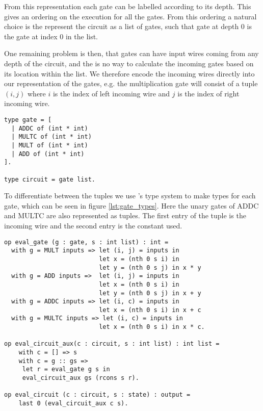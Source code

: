 
From this representation each gate can be labelled according to its depth. This
gives an ordering on the execution for all the gates. From this ordering a
natural choice is the represent the circuit as a list of gates, such that gate
at depth 0 is the gate at index 0 in the list.

One remaining problem is then, that gates can have input wires coming from any
depth of the circuit, and the is no way to calculate the incoming gates based on
its location within the list. We therefore encode the incoming wires directly
into our representation of the gates, e.g. the multiplication gate will consist
of a tuple $(i,j)$ where $i$ is the index of left incoming wire and $j$ is the
index of right incoming wire.

\begin{lstlisting}[float,label=lst:gate_types,caption=Type declaration of gates]
type gate = [
  | ADDC of (int * int)
  | MULTC of (int * int)
  | MULT of (int * int)
  | ADD of (int * int)
].

type circuit = gate list.
\end{lstlisting}

To differentiate between the tuples we use \easycrypt's type system to make
types for each gate, which can be seen in figure \ref{lst:gate_types}. Here the
unary gates of ADDC and MULTC are also represented as tuples. The first entry of
the tuple is the incoming wire and the second entry is the constant used.

\begin{lstlisting}[float,label=lst:circuit_eval,caption=Circuit evaluation function]
op eval_gate (g : gate, s : int list) : int =
  with g = MULT inputs => let (i, j) = inputs in
                          let x = (nth 0 s i) in
                          let y = (nth 0 s j) in x * y
  with g = ADD inputs =>  let (i, j) = inputs in
                          let x = (nth 0 s i) in
                          let y = (nth 0 s j) in x + y
  with g = ADDC inputs => let (i, c) = inputs in
                          let x = (nth 0 s i) in x + c
  with g = MULTC inputs => let (i, c) = inputs in
                          let x = (nth 0 s i) in x * c.

op eval_circuit_aux(c : circuit, s : int list) : int list =
    with c = [] => s
    with c = g :: gs =>
     let r = eval_gate g s in
     eval_circuit_aux gs (rcons s r).

op eval_circuit (c : circuit, s : state) : output =
    last 0 (eval_circuit_aux c s).
\end{lstlisting}

